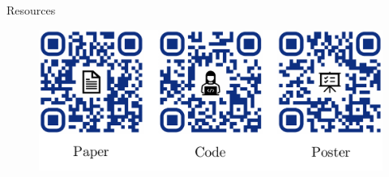 \documentclass[serif,onlymath,final,xcolor=table]{beamer}
\begin{document}
\begin{frame}
\begin{columns}[t]
\begin{column}{0.31\linewidth}
\begin{block}{Resources}
   \begin{figure}
    \includegraphics[width=\textwidth]{figures/resources.pdf}
    \end{figure}
\end{block}

\end{column}%

\end{columns}

\end{frame}
\end{document}
